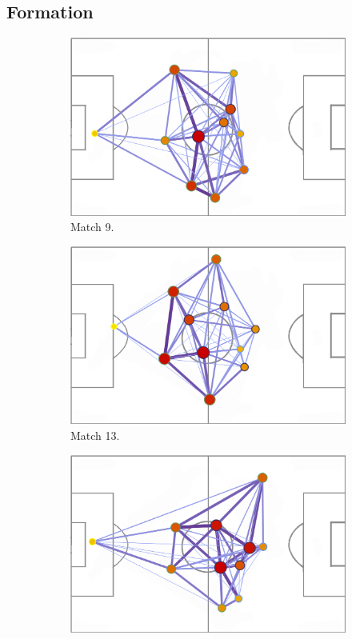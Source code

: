 \documentclass{mcmthesis}
\begin{document}
\subsection{Formation}
\begin{figure}[h]
	\centering
	\begin{subfigure}[b]{0.24\textwidth}
		\includegraphics[width=\textwidth]{figures/win_team1.png}
		\caption{Match 9.}
		\label{fig:win_team1}
	\end{subfigure}
	\begin{subfigure}[b]{0.24\textwidth}
		\includegraphics[width=\textwidth]{figures/win_team2.png}
		\caption{Match 13.}
		\label{fig:win_team2}
	\end{subfigure}
	\begin{subfigure}[b]{0.24\textwidth}
		\includegraphics[width=\textwidth]{figures/win_team3.png}

\end{subfigure}
\end{figure}
\end{document}
